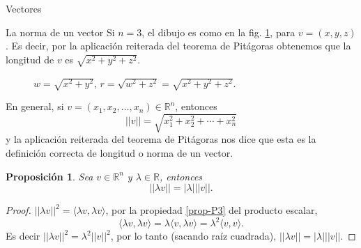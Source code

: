 \documentclass[a4paper,12pt,twoside,spanish,reqno]{amsbook}
\newtheorem{proposicion}[teorema]{Proposici\'on}
\theoremstyle{definition}
\theoremstyle{remark}
\newcommand{\la}{\langle}
\newcommand{\ra}{\rangle}
\newcommand{\R}{\mathbb R}
\begin{document}
\begin{chapter}{Vectores}
\begin{section}{La norma de un vector}
    Si $n=3$,  el dibujo es como en la fig. \ref{fig-pitagoras-3d}, para $v =(x,y,z)$.  Es decir,  por la aplicación reiterada del teorema de Pitágoras obtenemos que la longitud de $v$ es $\sqrt{x^2 + y^2 +z^2}$.
    \begin{figure}[h]
        \caption{$w= \sqrt{x^2 + y^2}$, $r = \sqrt{w^2 + z^2} = \sqrt{x^2 + y^2 +z^2}$.}
        \label{fig-pitagoras-3d}
    \end{figure} 
    
    En  general,  si $v =(x_1,x_2,\ldots,x_n) \in \R^n$,  entonces
    \begin{equation*}
        ||v|| = \sqrt{x_1^2+x_2^2+\cdots+x_n^2}
    \end{equation*} 
    y la aplicación reiterada del  teorema de Pitágoras nos dice que esta es la definición correcta de longitud o norma de un vector. 
    
    \begin{proposicion}\label{prop-lambda-norma}
        Sea $v \in \R^n$ y $\lambda \in \R$,  entonces
        \begin{equation*}
            ||\lambda v|| = |\lambda|||v||.
        \end{equation*}
    \end{proposicion}
    \begin{proof}
        $||\lambda v||^2 = \la\lambda v, \lambda v \ra$, por la propiedad \ref{prop-P3} del producto escalar, 
        \begin{equation*}
            \la\lambda v, \lambda v \ra = \lambda\la v, \lambda v \ra = \lambda^2\la v, v  \ra.
        \end{equation*}
        Es decir 	$||\lambda v||^2 =  \lambda^2 ||v||^2$, por lo tanto (sacando raíz cuadrada), $||\lambda v|| = |\lambda|||v||$.
    \end{proof}
    

\end{section}
\end{chapter}
\end{document}
